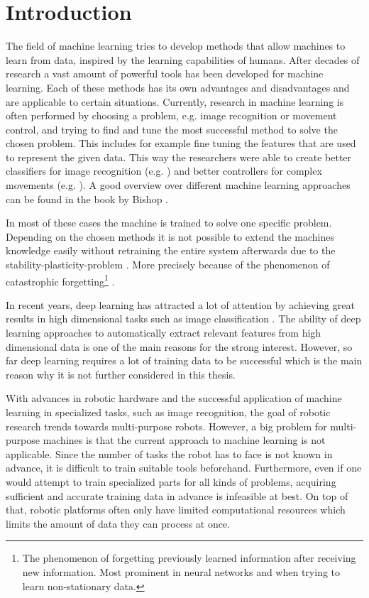 \chapter{Introduction}


The field of machine learning tries to develop methods that allow machines to learn from data, inspired by the learning capabilities of humans.
After decades of research a vast amount of powerful tools has been developed for machine learning. Each of these methods has its own advantages and disadvantages and are applicable to certain situations. Currently, research in machine learning is often performed by choosing a problem, e.g. image recognition or movement control, and trying to find and tune the most successful method to solve the chosen problem. This includes for example fine tuning the features that are used to represent the given data. This way the researchers were able to create better classifiers for image recognition (e.g. \cite{Liao20141187}) and better controllers for complex movements (e.g. \cite{NIPS2014_5444}). A good overview over different machine learning approaches can be found in the book by Bishop \cite{bishop2006pattern}.

In most of these cases the machine is trained to solve one specific problem. Depending on the chosen methods it is not possible to extend the machines knowledge easily without retraining the entire system afterwards due to the stability-plasticity-problem \cite{GROSSBERG198817}. More precisely because of the phenomenon of catastrophic forgetting\footnote{The phenomenon of forgetting previously learned information after receiving new information. Most prominent in neural networks and when trying to learn non-stationary data.} \cite{catastrophicForgetting1}.

In recent years, deep learning \cite{deepLearning2009,deepFrontier} has attracted a lot of attention by achieving great results in high dimensional tasks such as image classification \cite{deepImageClassification}. The ability of deep learning approaches to automatically extract relevant features from high dimensional data is one of the main reasons for the strong interest. However, so far deep learning requires a lot of training data to be successful which is the main reason why it is not further considered in this thesis.

With advances in robotic hardware and the successful application of machine learning in specialized tasks, such as image recognition, the goal of robotic research trends towards multi-purpose robots. However, a big problem for multi-purpose machines is that the current approach to machine learning is not applicable. Since the number of tasks the robot has to face is not known in advance, it is difficult to train suitable tools beforehand. Furthermore, even if one would attempt to train specialized parts for all kinds of problems, acquiring sufficient and accurate training data in advance is infeasible at best. On top of that, robotic platforms often only have limited computational resources which limits the amount of data they can process at once.

